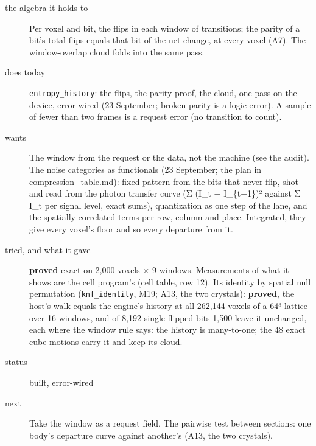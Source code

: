 \begin{description}
\item[{the algebra it holds to}] Per voxel and bit, the flips in each window of transitions; the parity of a bit's total flips equals that bit of the net change, at every voxel (A7). The window-overlap cloud folds into the same pass.
\item[{does today}] \texttt{entropy\_\allowbreak{}history}: the flips, the parity proof, the cloud, one pass on the device, error-wired (23 September; broken parity is a logic error). A sample of fewer than two frames is a request error (no transition to count).
\item[{wants}] The window from the request or the data, not the machine (see the audit). The noise categories as functionals (23 September; the plan in compression\_\allowbreak{}table.md): fixed pattern from the bits that never flip, shot and read from the photon transfer curve (Σ (I\_\allowbreak{}t − I\_\allowbreak{}\{t−1\})² against Σ I\_\allowbreak{}t per signal level, exact sums), quantization as one step of the lane, and the spatially correlated terms per row, column and place. Integrated, they give every voxel's floor and so every departure from it.
\item[{tried, and what it gave}] \textbf{proved} exact on 2,000 voxels × 9 windows. Measurements of what it shows are the cell program's (cell table, row 12). Its identity by spatial null permutation (\texttt{knf\_\allowbreak{}identity}, M19; A13, the two crystals): \textbf{proved}, the host's walk equals the engine's history at all 262,144 voxels of a 64³ lattice over 16 windows, and of 8,192 single flipped bits 1,500 leave it unchanged, each where the window rule says: the history is many-to-one; the 48 exact cube motions carry it and keep its cloud.
\item[{status}] built, error-wired
\item[{next}] Take the window as a request field. The pairwise test between sections: one body's departure curve against another's (A13, the two crystals).
\end{description}

